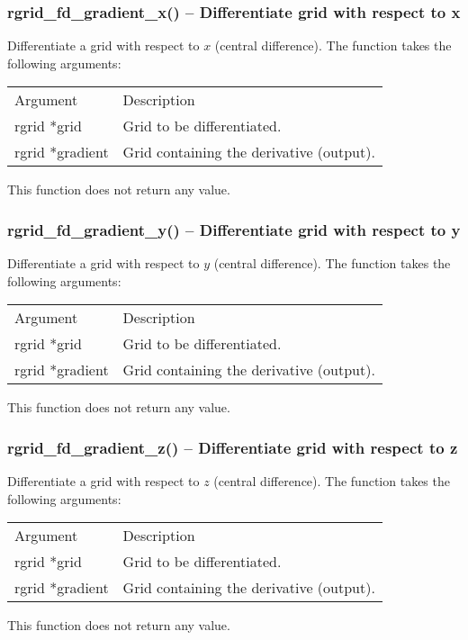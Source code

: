 \documentclass[12pt,letterpaper]{article}
\begin{document}
\subsubsection{rgrid\_fd\_gradient\_x() -- Differentiate grid with respect to x}

Differentiate a grid with respect to $x$ (central difference). The function takes the following arguments:
\begin{longtable}{p{} p{}}
Argument & Description\\
\cline{1-2}
rgrid *grid & Grid to be differentiated.\\
rgrid *gradient & Grid containing the derivative (output).\\
\end{longtable}
\noindent
This function does not return any value.

\subsubsection{rgrid\_fd\_gradient\_y() -- Differentiate grid with respect to y}

Differentiate a grid with respect to $y$ (central difference). The function takes the following arguments:
\begin{longtable}{p{} p{}}
Argument & Description\\
\cline{1-2}
rgrid *grid & Grid to be differentiated.\\
rgrid *gradient & Grid containing the derivative (output).\\
\end{longtable}
\noindent
This function does not return any value.

\subsubsection{rgrid\_fd\_gradient\_z() -- Differentiate grid with respect to z}

Differentiate a grid with respect to $z$ (central difference). The function takes the following arguments:
\begin{longtable}{p{} p{}}
Argument & Description\\
\cline{1-2}
rgrid *grid & Grid to be differentiated.\\
rgrid *gradient & Grid containing the derivative (output).\\
\end{longtable}
\noindent
This function does not return any value.
\end{document}
